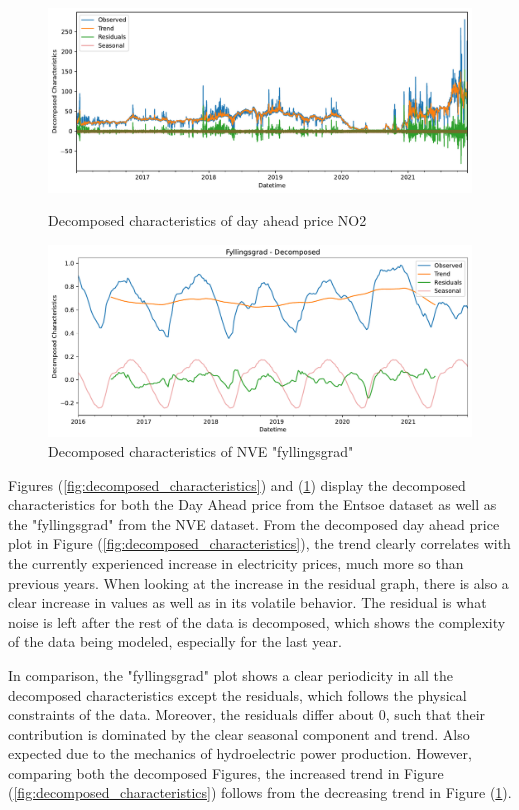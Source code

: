 \documentclass
[twocolumn,
secnumarabic,
nobibnotes,
aps,
prl,
reprint,
groupedaddress,
amsmath,
amssymb,
]{revtex4-2}
\begin{document}
\begin{figure}
  \includegraphics[width=2.1\columnwidth]{figures/decomposed_characteristics.pdf}
  \caption{\label{fig:decomposed_characteristics} Decomposed characteristics of day ahead price NO2}
  \includegraphics[width=2.1\columnwidth]{figures/NVE_decomposed_characteristics.pdf}
  \caption{\label{fig:NVE_decomposed_characteristics} Decomposed characteristics of NVE "fyllingsgrad"}
\end{figure}

Figures (\ref{fig:decomposed_characteristics}) and (\ref{fig:NVE_decomposed_characteristics}) display the decomposed characteristics for both the Day Ahead price from the Entsoe dataset as well as the "fyllingsgrad" from the NVE dataset. From the decomposed day ahead price plot in Figure (\ref{fig:decomposed_characteristics}), the trend clearly correlates with the currently experienced increase in electricity prices, much more so than previous years. When looking at the increase in the residual graph, there is also a clear increase in values as well as in its volatile behavior. The residual is what noise is left after the rest of the data is decomposed, which shows the complexity of the data being modeled, especially for the last year. 

In comparison, the "fyllingsgrad" plot shows a clear periodicity in all the decomposed characteristics except the residuals, which follows the physical constraints of the data. Moreover, the residuals differ about 0, such that their contribution is dominated by the clear seasonal component and trend. Also expected due to the mechanics of hydroelectric power production. However, comparing both the decomposed Figures, the increased trend in Figure (\ref{fig:decomposed_characteristics}) follows from the decreasing trend in Figure (\ref{fig:NVE_decomposed_characteristics}). 
\end{document}
